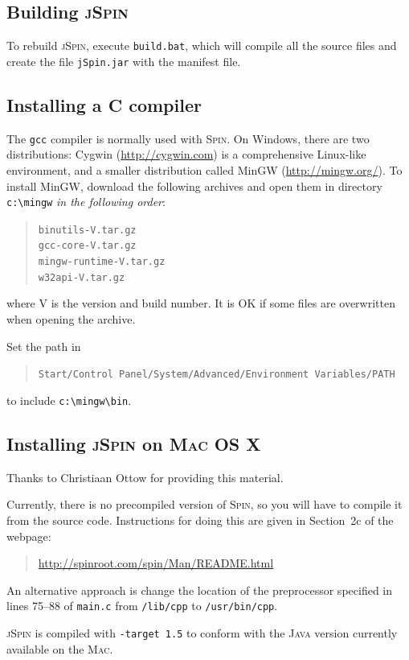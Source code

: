 \documentclass[11pt]{article}
\newcommand{\spn}{\textsc{Spin}}
\newcommand{\js}{\textsc{jSpin}}
\newcommand{\p}[1]{\texttt{#1}}
\begin{document}
\subsection{Building \js{}}

To rebuild \js{}, execute \p{build.bat}, which will compile all the source
files and create the file \p{jSpin.jar} with the manifest file.

\subsection{Installing a C compiler}\label{a.c}
The \p{gcc} compiler is normally used with \spn{}. On Windows, there are
two distributions: Cygwin (\url{http://cygwin.com}) is a comprehensive
Linux-like environment, and a smaller distribution called MinGW
(\url{http://mingw.org/}). To install MinGW, download the following archives and
open them in directory \verb=c:\mingw= \emph{in the following order}:
\begin{quote}
\p{binutils-V.tar.gz}\\
\p{gcc-core-V.tar.gz}\\
\p{mingw-runtime-V.tar.gz}\\
\p{w32api-V.tar.gz}
\end{quote}
where V is the version and build number.
It is OK if some files are overwritten when opening the archive.

Set the path in
\begin{quote}
\p{Start/Control Panel/System/Advanced/Environment Variables/PATH}
\end{quote}
to include \verb=c:\mingw\bin=.

\subsection{Installing \js{} on \textsc{Mac OS X}}\label{a.mac}

Thanks to Christiaan Ottow for providing this material.

Currently, there is no precompiled version of \spn{}, so you will have to
compile it from the source code. Instructions for doing this are given
in Section~2c of the webpage:
\begin{quote}
\url{http://spinroot.com/spin/Man/README.html}
\end{quote}
An alternative approach is change the location of the preprocessor specified in 
lines 75--88 of \p{main.c} from \p{/lib/cpp} to \p{/usr/bin/cpp}.

\js{} is compiled with \p{-target 1.5} to conform with the \textsc{Java}
version currently available on the \textsc{Mac}.
\end{document}
